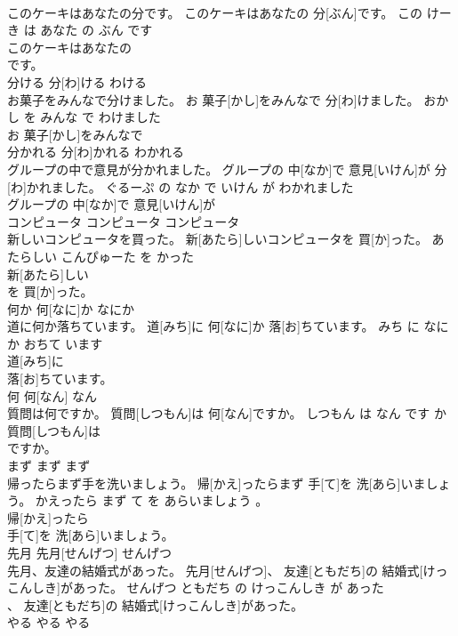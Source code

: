 \documentclass[8pt]{extreport}
\begin{document}
\begin{CJK}{UTF8}{min}
\\	このケーキはあなたの分です。	このケーキはあなたの 分[ぶん]です。	この けーき は あなた の ぶん です	
\\	このケーキはあなたの
\\	です。		
\\	分ける	分[わ]ける	わける	
\\	お菓子をみんなで分けました。	お 菓子[かし]をみんなで 分[わ]けました。	おかし を みんな で わけました	
\\	お 菓子[かし]をみんなで
\\	分かれる	分[わ]かれる	わかれる	
\\	グループの中で意見が分かれました。	グループの 中[なか]で 意見[いけん]が 分[わ]かれました。	ぐるーぷ の なか で いけん が わかれました	
\\	グループの 中[なか]で 意見[いけん]が
\\	コンピュータ	コンピュータ	コンピュータ	
\\	新しいコンピュータを買った。	新[あたら]しいコンピュータを 買[か]った。	あたらしい こんぴゅーた を かった	
\\	新[あたら]しい
\\	を 買[か]った。		
\\	何か	何[なに]か	なにか	
\\	道に何か落ちています。	道[みち]に 何[なに]か 落[お]ちています。	みち に なにか おちて います	
\\	道[みち]に
\\	落[お]ちています。		
\\	何	何[なん]	なん	
\\	質問は何ですか。	質問[しつもん]は 何[なん]ですか。	しつもん は なん です か	
\\	質問[しつもん]は
\\	ですか。		
\\	まず	まず	まず	
\\	帰ったらまず手を洗いましょう。	帰[かえ]ったらまず 手[て]を 洗[あら]いましょう。	かえったら まず て を あらいましょう 。	
\\	帰[かえ]ったら
\\	手[て]を 洗[あら]いましょう。		
\\	先月	先月[せんげつ]	せんげつ	
\\	先月、友達の結婚式があった。	先月[せんげつ]、 友達[ともだち]の 結婚式[けっこんしき]があった。	せんげつ ともだち の けっこんしき が あった	
\\	、 友達[ともだち]の 結婚式[けっこんしき]があった。		
\\	やる	やる	やる	

\end{CJK}
\end{document}
